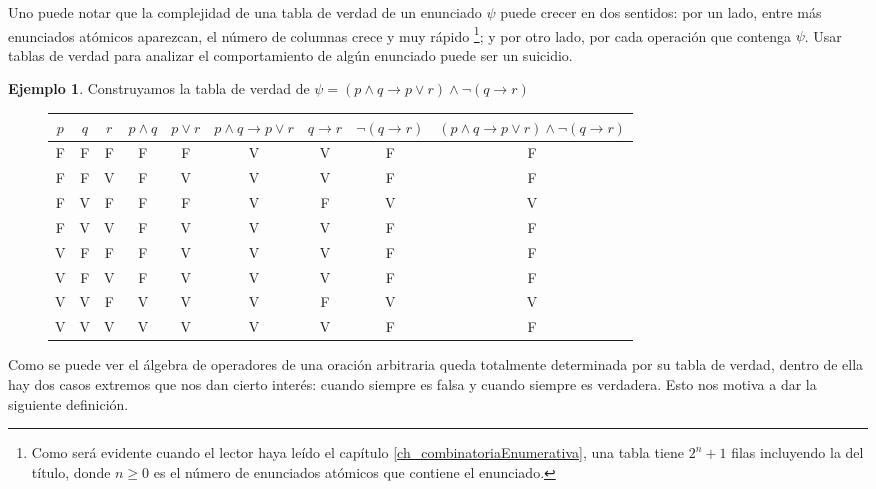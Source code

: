 \documentclass{book}
\theoremstyle{definition}
\newtheorem{ejm}{Ejemplo}[chapter]
\begin{document}
Uno puede notar que la complejidad de una tabla de verdad de un enunciado $\psi$ puede crecer en dos sentidos: por un lado, entre más enunciados atómicos aparezcan, el número de columnas crece y muy rápido
	\footnote{Como será evidente cuando el lector haya leído el capítulo \ref{ch_combinatoriaEnumerativa}, una tabla tiene $2^n+1$ filas incluyendo la del título, donde $n\geq 0$ es el número de enunciados atómicos que contiene el enunciado.};
y por otro lado, por cada operación que contenga $\psi$.
Usar tablas de verdad para analizar el comportamiento de algún enunciado puede ser un suicidio.
\begin{ejm}
	Construyamos la tabla de verdad de $\psi = \left(p \wedge q \rightarrow p \vee r \right)\wedge \neg \left(q \rightarrow r\right)$
	
	\begin{figure}[h]
	\begin{center}\begin{tabular}{|c|c|c||c|c|c|c|c|c|}
			\hline 
			$p$& $q$ & $r$ & $p \wedge q $ & $p \vee r$ & $p \wedge q  \rightarrow p \vee r $ & $q \rightarrow r$ & $\neg\left(q \rightarrow r\right)$ & $\left(p \wedge q \rightarrow p \vee r \right)\wedge \neg \left(q \rightarrow r\right)$ 
			\\
			\hline \hline
			F & F & F & F & F & V & V & F & F \\
			\hline
			F & F & V & F & V & V & V & F & F \\
			\hline
			F & V & F & F & F & V & F & V & V \\
			\hline
			F & V & V & F & V & V & V & F & F \\
			\hline
			V & F & F & F & V & V & V & F & F \\
			\hline
			V & F & V & F & V & V & V & F & F \\
			\hline
			V & V & F & V & V & V & F & V & V \\
			\hline
			V & V & V & V & V & V & V & F & F \\
			\hline
\end{tabular}\end{center}\end{figure}
\end{ejm}

Como se puede ver el álgebra de operadores de una oración arbitraria queda totalmente determinada por su tabla de verdad, dentro de ella hay dos casos extremos que nos dan cierto interés: cuando siempre es falsa y cuando siempre es verdadera. Esto nos motiva a dar la siguiente definición.
\end{document}
